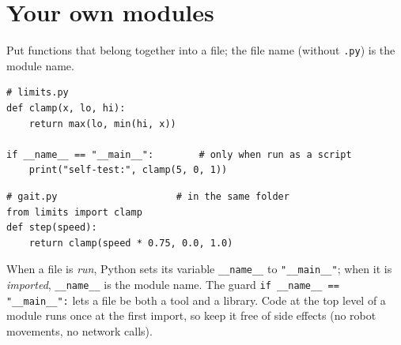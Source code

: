 \section*{Your own modules}
Put functions that belong together into a file; the file name (without \texttt{.py}) is the module name.
\begin{verbatim}
# limits.py
def clamp(x, lo, hi):
    return max(lo, min(hi, x))

if __name__ == "__main__":        # only when run as a script
    print("self-test:", clamp(5, 0, 1))
\end{verbatim}
\begin{verbatim}
# gait.py                     # in the same folder
from limits import clamp
def step(speed):
    return clamp(speed * 0.75, 0.0, 1.0)
\end{verbatim}
When a file is \emph{run}, Python sets its variable \texttt{\_\_name\_\_} to \texttt{"\_\_main\_\_"}; when it is \emph{imported}, \texttt{\_\_name\_\_} is the module name. The guard \verb!if __name__ == "__main__":! lets a file be both a tool and a library. Code at the top level of a module runs once at the first import, so keep it free of side effects (no robot movements, no network calls).

